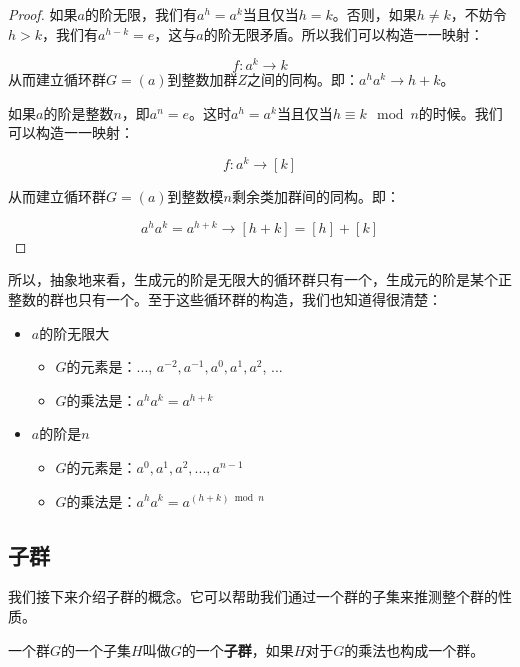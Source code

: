 \documentclass{article}
\begin{document}
\begin{proof}
如果$a$的阶无限，我们有$a^h = a^k$当且仅当$h = k$。否则，如果$h \neq k$，不妨令$h > k$，我们有$a^{h - k} = e$，这与$a$的阶无限矛盾。所以我们可以构造一一映射：

\[
f: a^k \to k
\]
从而建立循环群$G=(a)$到整数加群$Z$之间的同构。即：$a^ha^k \to h + k$。

如果$a$的阶是整数$n$，即$a^n = e$。这时$a^h = a^k$当且仅当$h \equiv k \mod n$的时候。我们可以构造一一映射：

\[
f: a^k \to [k]
\]

从而建立循环群$G = (a)$到整数模$n$剩余类加群间的同构。即：

\[
a^ha^k = a^{h + k} \to [h + k] = [h] + [k]
\]
\end{proof}

所以，抽象地来看，生成元的阶是无限大的循环群只有一个，生成元的阶是某个正整数的群也只有一个。至于这些循环群的构造，我们也知道得很清楚：

\begin{itemize}
\item $a$的阶无限大
  \begin{itemize}
  \item $G$的元素是：..., $a^{-2}, a^{-1}, a^0, a^1, a^2$, ...
  \item $G$的乘法是：$a^ha^k = a^{h + k}$
  \end{itemize}
\item $a$的阶是$n$
  \begin{itemize}
  \item $G$的元素是：$a^0, a^1, a^2, ..., a^{n-1}$
  \item $G$的乘法是：$a^ha^k = a^{(h + k) \bmod n}$
  \end{itemize}
\end{itemize}

\begin{Exercise}
\end{Exercise}

\subsection{子群}
我们接下来介绍子群的概念。它可以帮助我们通过一个群的子集来推测整个群的性质。

\begin{definition}
一个群$G$的一个子集$H$叫做$G$的一个\textbf{子群}，如果$H$对于$G$的乘法也构成一个群。
\end{definition}
\end{document}
